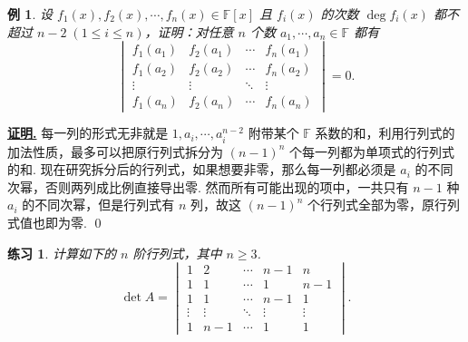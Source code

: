 \documentclass[10pt,openany]{article}
\theoremstyle{thmstyle} %
\newtheorem{practice}{练习}[section]
\theoremstyle{defstyle} %
\theoremstyle{prostyle} %
\theoremstyle{exastyle}
\newtheorem{example}[theorem]{例}
\theoremstyle{remstyle}
\renewenvironment{proof}[1][证明]{\par\underline{\textbf{#1.}} \;\fangsong}{\qed\par}
\newcommand{\F}{\mathbb{F}}
\begin{document}
\begin{example} \label{4.1.5}
	设 \( f_1(x), f_2(x), \cdots, f_n(x) \in \F[x] \) 且 \( f_i(x) \) 的次数 \( \deg f_i(x) \) 都不超过 \( n-2 \; (1 \leq i \leq n)\)，证明：对任意 \( n \) 个数 \( a_1,\cdots,a_n \in \F \) 都有
	\[ \begin{vmatrix}
		f_1(a_1) & f_2(a_1) & \cdots & f_n(a_1) \\
		f_1(a_2) & f_2(a_2) & \cdots & f_n(a_2) \\
		\vdots & \vdots & \ddots & \vdots \\
		f_1(a_n) & f_2(a_n) & \cdots & f_n(a_n)
	\end{vmatrix}=0. \]
\end{example}

\begin{proof}
	每一列的形式无非就是 \( 1,a_i,\cdots,a_i^{n-2} \) 附带某个 \( \F \) 系数的和，利用行列式的加法性质，最多可以把原行列式拆分为 \( (n-1)^n \) 个每一列都为单项式的行列式的和. 现在研究拆分后的行列式，如果想要非零，那么每一列都必须是 \( a_i \) 的不同次幂，否则两列成比例直接导出零. 然而所有可能出现的项中，一共只有 \( n-1 \) 种 \( a_i \) 的不同次幂，但是行列式有 \( n \) 列，故这 \( (n-1)^n \) 个行列式全部为零，原行列式值也即为零.
\end{proof}


\begin{practice}
	计算如下的 \( n \) 阶行列式，其中 \( n \geq 3 \).
	\[ \det A= \begin{vmatrix}
		1 & 2 &  \cdots & n-1 & n \\
		1 & 1 &  \cdots & 1 &  n-1 \\
		1 & 1 &  \cdots & n-1 & 1 \\
		\vdots & \vdots & \ddots  & \vdots & \vdots \\
		1 & n-1 & \cdots & 1 & 1
	\end{vmatrix}. \]
\end{practice}
\end{document}
